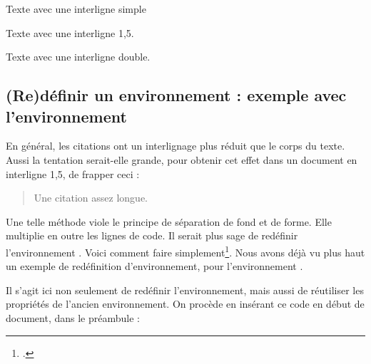 \begin{latexcode}
\begin{singlespace}
Texte avec une interligne simple
\end{singlespace}
\begin{onehalfspace}
Texte avec une interligne 1,5.
\end{onehalfspace}
\begin{doublespace}
Texte avec une interligne double.
\end{doublespace}
\end{latexcode}

\subsection[Rédéfinir un environnement : quotation]{(Re)définir un environnement : exemple avec l'environnement }

En général, les citations ont un interlignage plus réduit que le corps du texte. Aussi la tentation serait-elle grande, pour obtenir cet effet dans un document en interligne 1,5, de frapper ceci :

\begin{latexcode}
\begin{singlespace}
\begin{quotation}
Une citation assez longue.
\end{quotation}
\end{singlespace}
\end{latexcode}

Une telle méthode viole le principe de séparation de fond et de forme. Elle multiplie en outre les lignes de code. Il serait plus sage de redéfinir l'environnement . Voici comment faire simplement\footcite[Nous nous somme basés sur la classe  :][]{bredele}. Nous avons déjà vu plus haut un exemple de redéfinition d'environnement, pour l'environnement . 

Il s'agit ici non seulement de redéfinir l'environnement, mais aussi de réutiliser les propriétés de l'ancien environnement. On procède en insérant ce code en début de document, dans le préambule :

\begin{latexcode}
\let\oldquotation\quotation
\let\endoldquotation\endquotation
\renewenvironment{quotation}
    {\begin{oldquotation}\singlespace}
        {\end{oldquotation}}
\end{latexcode}

